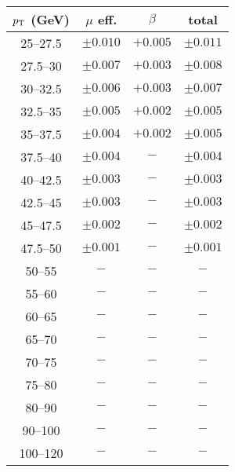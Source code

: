 \begin{tabular}{c|cc|c}
$p_\text{T}$ (GeV)  & $\mu$ eff. & $\beta$ & total \\
\hline
25--27.5 & $\pm0.010$ & $+0.005$ & $\pm0.011$\\
27.5--30 & $\pm0.007$ & $+0.003$ & $\pm0.008$\\
30--32.5 & $\pm0.006$ & $+0.003$ & $\pm0.007$\\
32.5--35 & $\pm0.005$ & $+0.002$ & $\pm0.005$\\
35--37.5 & $\pm0.004$ & $+0.002$ & $\pm0.005$\\
37.5--40 & $\pm0.004$ & $-$ & $\pm0.004$\\
40--42.5 & $\pm0.003$ & $-$ & $\pm0.003$\\
42.5--45 & $\pm0.003$ & $-$ & $\pm0.003$\\
45--47.5 & $\pm0.002$ & $-$ & $\pm0.002$\\
47.5--50 & $\pm0.001$ & $-$ & $\pm0.001$\\
50--55 & $-$ & $-$ & $-$\\
55--60 & $-$ & $-$ & $-$\\
60--65 & $-$ & $-$ & $-$\\
65--70 & $-$ & $-$ & $-$\\
70--75 & $-$ & $-$ & $-$\\
75--80 & $-$ & $-$ & $-$\\
80--90 & $-$ & $-$ & $-$\\
90--100 & $-$ & $-$ & $-$\\
100--120 & $-$ & $-$ & $-$\\
\end{tabular}
